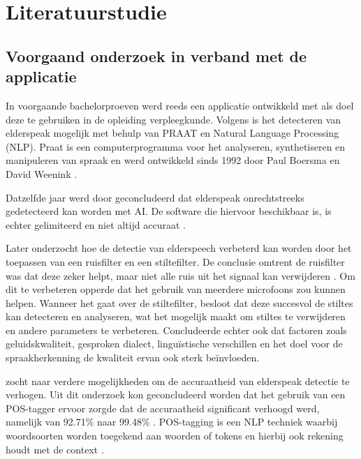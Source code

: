 \section{Literatuurstudie}%
\label{sec:literatuurstudie}

\subsection{Voorgaand onderzoek in verband met de applicatie}%

In voorgaande bachelorproeven werd reeds een applicatie ontwikkeld met als doel deze te gebruiken in de opleiding verpleegkunde. Volgens \textcite{Govaerts2022} is het detecteren van elderspeak mogelijk met behulp van PRAAT en Natural Language Processing (NLP). Praat is een computerprogramma voor het analyseren, synthetiseren en manipuleren van spraak en werd ontwikkeld sinds 1992 door Paul Boersma en David Weenink \autocite{Govaerts2022}.

Datzelfde jaar werd door \textcite{Gussem2022} geconcludeerd dat elderspeak onrechtstreeks gedetecteerd kan worden met AI. De software die hiervoor beschikbaar is, is echter gelimiteerd en niet altijd accuraat \autocite{Gussem2022}.

Later onderzocht \textcite{Daems2023} hoe de detectie van elderspeech verbeterd kan worden door het toepassen van een ruisfilter en een stiltefilter. De conclusie omtrent de ruisfilter was dat deze zeker helpt, maar niet alle ruis uit het signaal kan verwijderen \autocite{Daems2023}. Om dit te verbeteren opperde \textcite{Daems2023} dat het gebruik van meerdere microfoons zou kunnen helpen.
Wanneer het gaat over de stiltefilter, besloot \textcite{Daems2023} dat deze succesvol de stiltes kan detecteren en analyseren, wat het mogelijk maakt om stiltes te verwijderen en andere parameters te verbeteren. \textcite{Daems2023} Concludeerde echter ook dat factoren zoals geluidskwaliteit, gesproken dialect, linguïstische verschillen en het doel voor de spraakherkenning de kwaliteit ervan ook sterk beïnvloeden.

\textcite{Branden2024} zocht naar verdere mogelijkheden om de accuraatheid van elderspeak detectie te verhogen. Uit dit onderzoek kon geconcludeerd worden dat het gebruik van een POS-tagger ervoor zorgde dat de accuraatheid significant verhoogd werd, namelijk van 92.71\% naar 99.48\% \autocite{Branden2024}. POS-tagging is een NLP techniek waarbij woordsoorten worden toegekend aan woorden of tokens en hierbij ook rekening houdt met de context \autocite{Branden2024}.

